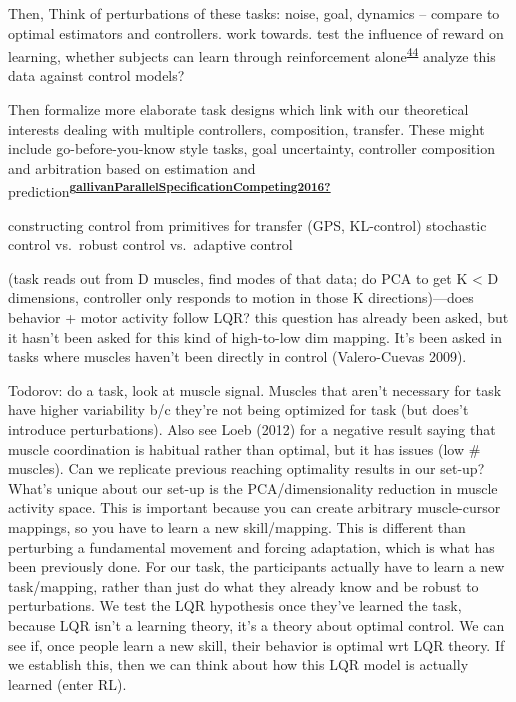 \documentclass[
  a4paper,
]{article}
\begin{document}
Then, Think of perturbations of these tasks: noise, goal, dynamics --
compare to optimal estimators and controllers. work towards. test the
influence of reward on learning, whether subjects can learn through
reinforcement
alone\textsuperscript{\protect\hyperlink{ref-vanderkooijLearningReachTrajectory2021}{44}}
analyze this data against control models?

Then formalize more elaborate task designs which link with our
theoretical interests dealing with multiple controllers, composition,
transfer. These might include go-before-you-know style tasks, goal
uncertainty, controller composition and arbitration based on estimation
and
prediction\textsuperscript{\protect\hyperlink{ref-gallivanParallelSpecificationCompeting2016}{\textbf{gallivanParallelSpecificationCompeting2016?}}}

constructing control from primitives for transfer (GPS, KL-control)
stochastic control vs.~robust control vs.~adaptive control

(task reads out from D muscles, find modes of that data; do PCA to get K
\textless{} D dimensions, controller only responds to motion in those K
directions)---does behavior + motor activity follow LQR? this question
has already been asked, but it hasn't been asked for this kind of
high-to-low dim mapping. It's been asked in tasks where muscles haven't
been directly in control (Valero-Cuevas 2009).

Todorov: do a task, look at muscle signal. Muscles that aren't necessary
for task have higher variability b/c they're not being optimized for
task (but does't introduce perturbations). Also see Loeb (2012) for a
negative result saying that muscle coordination is habitual rather than
optimal, but it has issues (low \# muscles). Can we replicate previous
reaching optimality results in our set-up? What's unique about our
set-up is the PCA/dimensionality reduction in muscle activity space.
This is important because you can create arbitrary muscle-cursor
mappings, so you have to learn a new skill/mapping. This is different
than perturbing a fundamental movement and forcing adaptation, which is
what has been previously done. For our task, the participants actually
have to learn a new task/mapping, rather than just do what they already
know and be robust to perturbations. We test the LQR hypothesis once
they've learned the task, because LQR isn't a learning theory, it's a
theory about optimal control. We can see if, once people learn a new
skill, their behavior is optimal wrt LQR theory. If we establish this,
then we can think about how this LQR model is actually learned (enter
RL).
\end{document}

